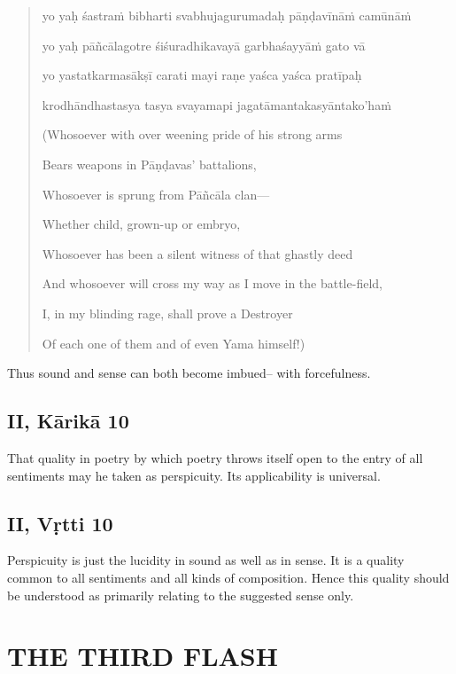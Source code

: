 \documentclass[12pt]{book}
\begin{document}
\begin{quotation}
\begin{em}
yo yaḥ śastraṁ bibharti svabhujagurumadaḥ pāṇḍavīnāṁ camūnāṁ

yo yaḥ pāñcālagotre śiśuradhikavayā garbhaśayyāṁ gato vā

yo yastatkarmasākṣī carati mayi raṇe yaśca yaśca pratīpaḥ

krodhāndhastasya tasya svayamapi jagatāmantakasyāntako'haṁ

(Whosoever with over weening pride of his strong arms

Bears weapons in Pāṇḍavas' battalions,

Whosoever is sprung from Pāñcāla clan---

Whether child, grown-up or embryo,

Whosoever has been a silent witness of that ghastly deed

And whosoever will cross my way as I move in the battle-field,

I, in my blinding rage, shall prove a Destroyer

Of each one of them and of even Yama himself!)
\end{em}
\end{quotation}

Thus sound and sense can both become imbued-- with
forcefulness.

\section{II, Kārikā 10}

That quality in poetry by which poetry throws itself open
to the entry of all sentiments may he taken as perspicuity.
Its applicability is universal.


\section{II, Vṛtti 10}

Perspicuity is just the lucidity in sound as well as in sense.
It is a quality common to all sentiments and all kinds of composition. Hence this quality should be understood as primarily
relating to the suggested sense only.




\chapter{THE THIRD FLASH}
\end{document}
